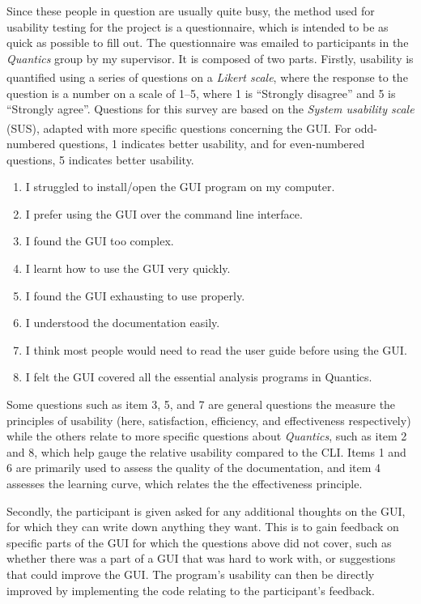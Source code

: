 \documentclass[12pt]{article}
\begin{document}
Since these people in question are usually quite busy, the method used for usability testing for the project is a questionnaire, which is intended to be as quick as possible to fill out. The questionnaire was emailed to participants in the \textit{Quantics} group by my supervisor. It is composed of two parts. Firstly, usability is quantified using a series of questions on a \textit{Likert scale}\textsuperscript{\cite{likert}}, where the response to the question is a number on a scale of 1--5, where 1 is ``Strongly disagree'' and 5 is ``Strongly agree''. Questions for this survey are based on the \textit{System usability scale} (SUS),\textsuperscript{\cite{sus}} adapted with more specific questions concerning the GUI. For odd-numbered questions, 1 indicates better usability, and for even-numbered questions, 5 indicates better usability.

\begin{enumerate}
    \item I struggled to install/open the GUI program on my computer.
    \item I prefer using the GUI over the command line interface.
    \item I found the GUI too complex.
    \item I learnt how to use the GUI very quickly.
    \item I found the GUI exhausting to use properly.
    \item I understood the documentation easily.
    \item I think most people would need to read the user guide before using the GUI.
    \item I felt the GUI covered all the essential analysis programs in Quantics.
\end{enumerate}

Some questions such as item 3, 5, and 7 are general questions the measure the principles of usability (here, satisfaction, efficiency, and effectiveness respectively) while the others relate to more specific questions about \textit{Quantics}, such as item 2 and 8, which help gauge the relative usability compared to the CLI. Items 1 and 6 are primarily used to assess the quality of the documentation, and item 4 assesses the learning curve, which relates the the effectiveness principle.

Secondly, the participant is given asked for any additional thoughts on the GUI, for which they can write down anything they want. This is to gain feedback on specific parts of the GUI for which the questions above did not cover, such as whether there was a part of a GUI that was hard to work with, or suggestions that could improve the GUI. The program's usability can then be directly improved by implementing the code relating to the participant's feedback.
\end{document}
